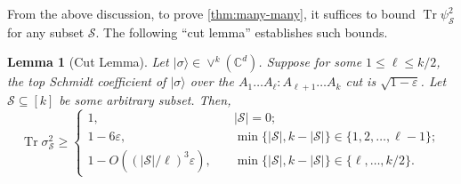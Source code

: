 \documentclass[10pt,a4paper]{article}
\newtheorem{lemma}[theorem]{Lemma}
\theoremstyle{remark}
\def\epsilon{\varepsilon}
\newcommand{\C}{{\mathbb C}}
\newcommand{\cS}{\mathcal{S}}
\newcommand{\1}[1]{\mathds{1}{[#1]}}
\newcommand{\ket}[1]{\lvert #1\rangle}
\DeclareMathOperator{\Tr}{Tr}
\newcommand{\Symm}[2]{\vee^{#1}(\C^{#2})}
\newcommand{\trace}{\operatorname{Tr}}
\numberwithin{equation}{section}
\begin{document}
From the above discussion, to prove \cref{thm:many-many}, it suffices to bound $\Tr\psi_\cS^2$ for any subset $\cS$. The following ``cut lemma'' establishes such bounds. 
\begin{lemma}[Cut Lemma]\label{lem:cut}
Let $\ket{\sigma}\in \Symm{k}{d}$.
Suppose for some  $1\le\ell \le k/2$, the top Schmidt coefficient of $\ket\sigma$ over the $A_1\ldots A_\ell : A_{\ell+1}\ldots A_k$ cut is $\sqrt{1-\epsilon}$. Let $\cS\subseteq [k]$ be some arbitrary  subset.
Then, 
\[
    \trace \sigma_\cS ^2 \ge \begin{cases}
        1, & \quad |\cS|  = 0;
        \\
        1-6\epsilon, & \quad \min\{|\cS|, k-|\cS|\} \in \{1,2,\ldots, \ell-1\};
        \\
        1- O((|\cS|/\ell)^3\epsilon), &\quad \min\{|\cS| , k-|\cS|\}\in \{\ell,\ldots, k/2\}.
    \end{cases}
\]
\end{lemma}
\end{document}
